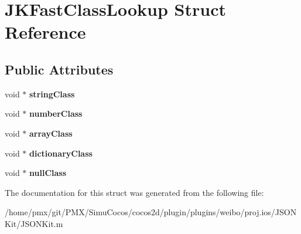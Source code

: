 \hypertarget{structJKFastClassLookup}{}\section{J\+K\+Fast\+Class\+Lookup Struct Reference}
\label{structJKFastClassLookup}
\subsection*{Public Attributes}
\begin{DoxyCompactItemize}
\item 
\mbox{\label{structJKFastClassLookup_acd04a4b7e019d6a55790817b854128a2}} 
void $\ast$ {\bfseries string\+Class}
\item 
\mbox{\label{structJKFastClassLookup_a603079acbc76d7743d135768f77baa85}} 
void $\ast$ {\bfseries number\+Class}
\item 
\mbox{\label{structJKFastClassLookup_ab0f7be4ff84fd61097b479e03cb6de94}} 
void $\ast$ {\bfseries array\+Class}
\item 
\mbox{\label{structJKFastClassLookup_a52147c32a09cabb2ffa9ff7ac1a27e5b}} 
void $\ast$ {\bfseries dictionary\+Class}
\item 
\mbox{\label{structJKFastClassLookup_a8399859e5563a816499b6d2ffdfb55ca}} 
void $\ast$ {\bfseries null\+Class}
\end{DoxyCompactItemize}


The documentation for this struct was generated from the following file\+:\begin{DoxyCompactItemize}
\item 
/home/pmx/git/\+P\+M\+X/\+Simu\+Cocos/cocos2d/plugin/plugins/weibo/proj.\+ios/\+J\+S\+O\+N\+Kit/J\+S\+O\+N\+Kit.\+m\end{DoxyCompactItemize}
